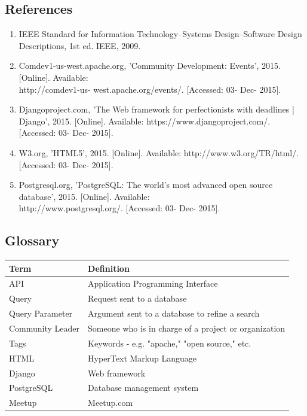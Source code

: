 \documentclass[draftclsnofoot,10pt,onecolumn]{IEEEtran} %
\begin{document}
\subsection{References}
	\begin{enumerate}
	
		\item IEEE Standard for Information Technology--Systems Design--Software Design Descriptions, 1st ed. IEEE, 2009. \\
		
		\item Comdev1-us-west.apache.org, 'Community Development: Events', 2015. [Online]. Available: \\ http://comdev1-us-
		west.apache.org/events/. [Accessed: 03- Dec- 2015]. \\
		
		\item Djangoproject.com, 'The Web framework for perfectionists with deadlines | Django', 2015. [Online]. Available:
		https://www.djangoproject.com/. [Accessed: 03- Dec- 2015]. \\
		
		\item W3.org, 'HTML5', 2015. [Online]. Available: http://www.w3.org/TR/html/. [Accessed: 03- Dec- 2015]. \\
		
		\item Postgresql.org, 'PostgreSQL: The world's most advanced open source database', 2015. [Online]. Available:\\
		http://www.postgresql.org/. [Accessed: 03- Dec- 2015]. \\
		
	\end{enumerate}

\subsection{Glossary}

\begin{longtable}[1]{ | C{7cm} | C{7cm} |} 
\hline
Term & Definition \\ 
\hline
API & Application Programming Interface\\
\hline
Query & Request sent to a database
\\
\hline
Query Parameter & Argument sent to a database to refine a search
\\
\hline
Community Leader & Someone who is in charge of a project or organization
\\
\hline
Tags &  Keywords - e.g. "apache," "open source," etc.
\\
\hline
HTML & HyperText Markup Language
\\
\hline
Django & Web framework
\\
\hline
PostgreSQL & Database management system
\\
\hline
Meetup & Meetup.com
\\
\hline
\end{longtable}
\end{document}
